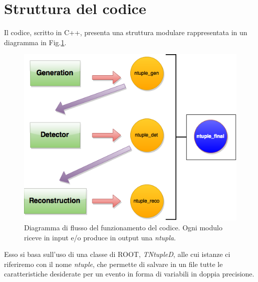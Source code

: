 \documentclass[8pt]{extarticle}
\begin{document}
\section{Struttura del codice} \label{sec:script}
Il codice, scritto in C++, presenta una struttura modulare rappresentata in un diagramma in Fig.\ref{fig:script_structure}.

\begin{figure}
	\begin{center}
		\includegraphics[scale=0.4]{script_structure}
		\caption{Diagramma di flusso del funzionamento del codice. Ogni modulo riceve in input e/o produce in output una \textit{ntupla}.}
		\label{fig:script_structure}
	\end{center}
\end{figure}

Esso si basa sull'uso di una classe di ROOT, \textit{TNtupleD}, alle cui istanze ci riferiremo con il nome \textit{ntuple}, che permette di salvare in un file tutte le caratteristiche desiderate per un evento in forma di variabili in doppia precisione. \\
\end{document}
